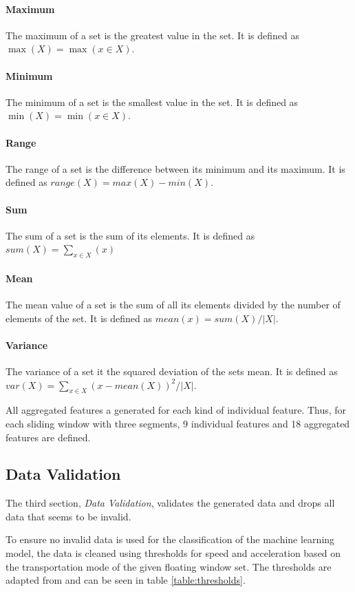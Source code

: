 \paragraph{Maximum} The maximum of a set is the greatest value in the set. It is defined as $ \max (X) = \max(x \in X)$.

\paragraph{Minimum} The minimum of a set is the smallest value in the set. It is defined as $ \min (X) = \min (x \in X) $.

\paragraph{Range} The range of a set is the difference between its minimum and its maximum. It is defined as $ range(X) = max(X) - min(X)$.  

\paragraph{Sum} The sum of a set is the sum of its elements. It is defined as $sum(X) = \sum_{x\in X} (x)$

\paragraph{Mean} The mean value of a set is the sum of all its elements divided by the number of elements of the set. It is defined as $ mean (x) = sum(X)/|X|$.

\paragraph{Variance} The variance of a set it the squared deviation of the sets mean. It is defined as $var (X) = \sum_{x\in X} (x - mean(X))^2/|X| $.

All aggregated features a generated for each kind of individual feature. Thus, for each sliding window with three segments, 9 individual features and 18 aggregated features are defined. 

\subsection{Data Validation}
The third section, \textit{Data Validation}, validates the generated data and drops all data that seems to be invalid.

To ensure no invalid data is used for the classification of the machine learning model, the data is cleaned using thresholds for speed and acceleration based on the transportation mode of the given floating window set. The thresholds are adapted from \cite{Dabiri2018} and can be seen in table \ref{table:thresholds}.
 

